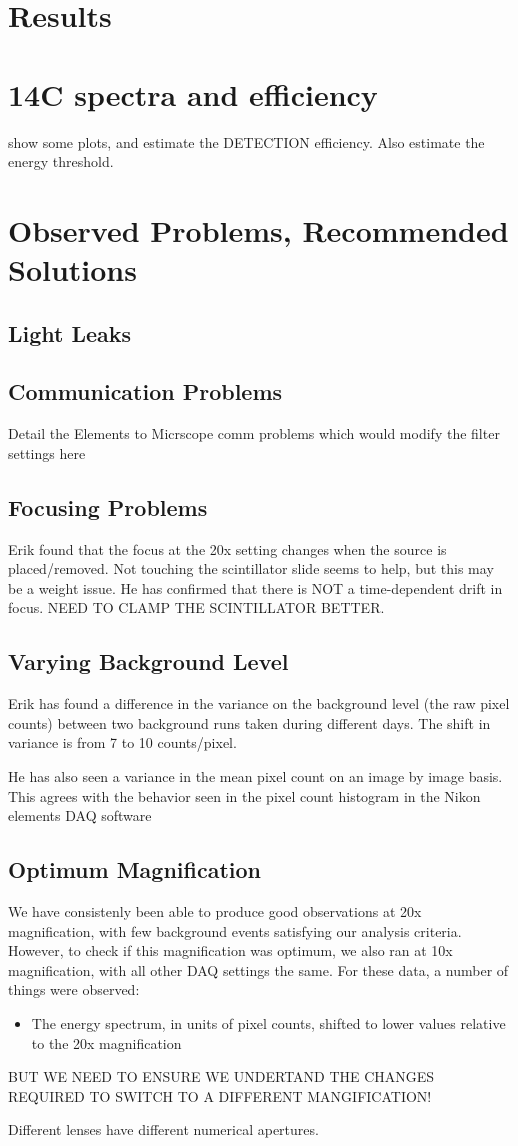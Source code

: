 \documentclass[11pt]{amsart}
\begin{document}
\section{Results}
\section{14C spectra and efficiency}
show some plots, and estimate the DETECTION efficiency. Also estimate the energy threshold.
 

\section{Observed Problems, Recommended Solutions}
\subsection{Light Leaks}
\subsection{Communication Problems}
Detail the Elements to Micrscope comm problems which would modify the filter settings here

\subsection{Focusing Problems}
Erik found that the focus at the 20x setting changes when the source is placed/removed. Not touching the scintillator slide seems to help, but this may be a weight issue.
He has confirmed that there is NOT a time-dependent drift in focus. NEED TO CLAMP THE SCINTILLATOR BETTER.

\subsection{Varying Background Level}
Erik has found a difference in the variance on the background level (the raw pixel counts) between two background runs taken during different days. The shift in variance is from 7 to 10 counts/pixel.

He has also seen a variance in the mean pixel count on an image by image basis. This agrees with the behavior seen in the pixel count histogram in the Nikon elements DAQ software

\subsection{Optimum Magnification}
We have consistenly been able to produce good observations at 20x magnification, with few background events satisfying our analysis criteria. However, to check if this magnification was optimum, we also ran at 10x magnification, with all other DAQ settings the same. For these data, a number of things were observed:
\begin{itemize}
	\item The energy spectrum, in units of pixel counts, shifted to lower values relative to the 20x magnification
\end{itemize}
BUT WE NEED TO ENSURE WE UNDERTAND THE CHANGES REQUIRED TO SWITCH TO A DIFFERENT MANGIFICATION!

 Different lenses have different numerical apertures. 
 
 
 
 

\end{document}

